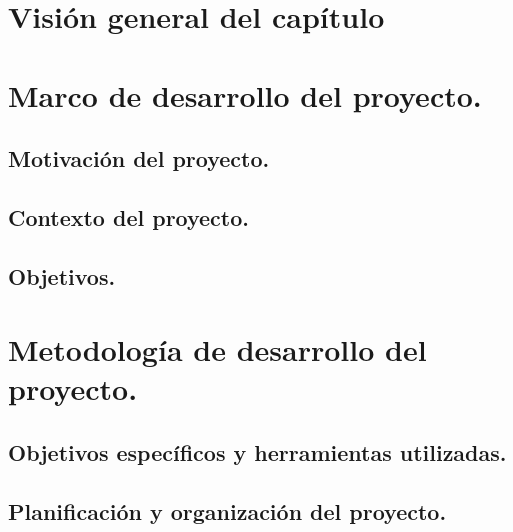 \section{Visión general del capítulo}

\section{Marco de desarrollo del proyecto.}

\subsection{Motivación del proyecto.}

\subsection{Contexto del proyecto.}

\subsection{Objetivos.}

\section{Metodología de desarrollo del proyecto.}

\subsection{Objetivos específicos y herramientas utilizadas.}

\subsection{Planificación y organización del proyecto.}


